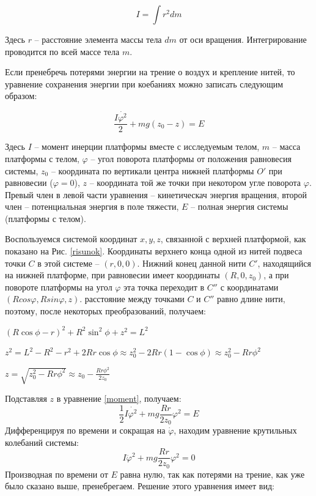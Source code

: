 \documentclass[a4paper,14pt]{extarticle}
\begin{document}
	\begin{equation}
		I = \int r^2 dm
	\end{equation}
	
	Здесь $r$ -- расстояние элемента массы тела $dm$ от оси вращения. Интегрирование проводится по всей массе тела $m$.
	
	Если пренебречь потерями энергии на трение о воздух и крепление нитей, то уравнение сохранения энергии при коебаниях можно записать следующим образом:
	
	\begin{equation}\label{moment}
		\frac{I \dot{\varphi^2}}{2} + mg(z_0-z) = E
	\end{equation}
	
	Здесь $I$ -- момент инерции платформы вместе с исследуемым телом, $m$ -- масса платформы с телом, $\varphi$ -- угол поворота платформы от положения равновесия системы, $z_0$ -- координата по вертикали центра нижней платформы $O'$  при равновесии ($\varphi = 0$), $z$ -- координата той же точки при некотором угле поворота $\varphi$. Превый член в левой части уравнения -- кинетическач энергия вращения, второй член -- потенциальная энергия в поле тяжести, $E$ -- полная энергия системы (платформы с телом).
	
	Воспользуемся системой координат $x, y, z$, связанной с верхней платформой, как показано на Рис. \ref{risunok}. Координаты верхнего конца одной из нитей подвеса точки $C$ в этой системе -- $(r, 0, 0)$. Нижний конец данной нити $C'$, находящийся на нижней платформе, при равновесии имеет координаты $(R, 0, z_0)$, а при повороте платформы на угол $\varphi$ эта точка переходит в $C''$ с координатами $(Rcos\varphi, Rsin\varphi, z)$. расстояние между точками $C$ и $C''$ равно длине нити, поэтому, после некоторых преобразований, получаем: 
	
	\begin{center}
			$ (R\cos\phi - r)^2 + R^2\sin^2\phi + z^2 = L^2 $
			
			$ z^2 = L^2 - R^2 - r^2 + 2Rr\cos\phi \approx z^2_{0} - 2Rr(1 - \cos\phi) \approx z^2_{0} - Rr\phi^2 $
			
			$ z = \sqrt{z^2_{0} - Rr\phi^2} \approx z_{0} - \frac{Rr\phi^2}{2z_{0}} $
	\end{center}
	Подставляя $z$ в уравнение \eqref{moment}, получаем:
	\begin{equation}
		\frac{1}{2}I\dot{\varphi^2} + mg \frac{Rr}{2z_0}\varphi^2 = E
	\end{equation}
	Дифференцируя по времени и сокращая на $\dot\varphi$, находим уравнение крутильных колебаний системы:
	\begin{equation}
		I\ddot\varphi^2 + mg\frac{Rr}{2z_0}\varphi^2 = 0
	\end{equation}
	Производная по времени от $E$ равна нулю, так как потерями на трение, как уже было сказано выше, пренебрегаем.
	Решение этого уравнения имеет вид:
	
\end{document}
